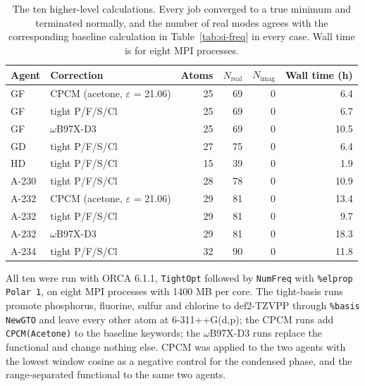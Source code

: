 \documentclass[11pt]{article}
\begin{document}
\begin{table}[htbp]
\centering
\caption{The ten higher-level calculations. Every job converged to a true minimum and terminated normally, and the number of real modes agrees with the corresponding baseline calculation in Table~\ref{tab:si-freq} in every case. Wall time is for eight MPI processes.}
\label{tab:si-b2jobs}
\footnotesize
\begin{tabular}{llrrrr}
\toprule
Agent & Correction & Atoms & $N_\mathrm{real}$ & $N_\mathrm{imag}$ & Wall time (h) \\
\midrule
GF & CPCM (acetone, $\varepsilon$ = 21.06) & 25 & 69 & 0 & 6.4 \\
GF & tight P/F/S/Cl & 25 & 69 & 0 & 6.7 \\
GF & $\omega$B97X-D3 & 25 & 69 & 0 & 10.5 \\
GD & tight P/F/S/Cl & 27 & 75 & 0 & 6.4 \\
HD & tight P/F/S/Cl & 15 & 39 & 0 & 1.9 \\
A-230 & tight P/F/S/Cl & 28 & 78 & 0 & 10.9 \\
A-232 & CPCM (acetone, $\varepsilon$ = 21.06) & 29 & 81 & 0 & 13.4 \\
A-232 & tight P/F/S/Cl & 29 & 81 & 0 & 9.7 \\
A-232 & $\omega$B97X-D3 & 29 & 81 & 0 & 18.3 \\
A-234 & tight P/F/S/Cl & 32 & 90 & 0 & 11.8 \\
\bottomrule
\end{tabular}

\begin{flushleft}\footnotesize All ten were run with ORCA 6.1.1, \texttt{TightOpt} followed by \texttt{NumFreq} with \texttt{\%elprop Polar 1}, on eight MPI processes with 1400 MB per core. The tight-basis runs promote phosphorus, fluorine, sulfur and chlorine to def2-TZVPP through \texttt{\%basis NewGTO} and leave every other atom at 6-311++G(d,p); the CPCM runs add \texttt{CPCM(Acetone)} to the baseline keywords; the $\omega$B97X-D3 runs replace the functional and change nothing else. CPCM was applied to the two agents with the lowest window cosine as a negative control for the condensed phase, and the range-separated functional to the same two agents.\end{flushleft}
\end{table}
\clearpage
\end{document}
